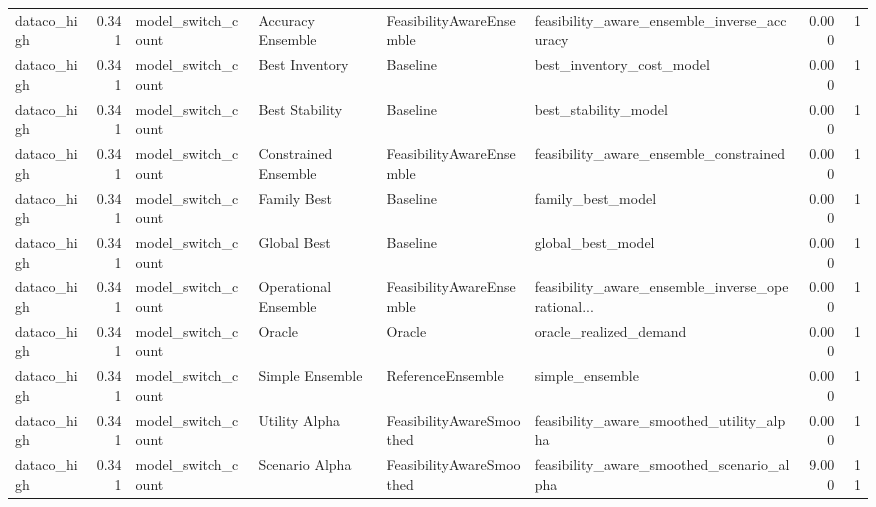 \begin{table}
{\begin{tabular}{lrllllrr}
   dataco\_high &             0.341 &          model\_switch\_count &     Accuracy Ensemble &  FeasibilityAwareEnsemble &        feasibility\_aware\_ensemble\_inverse\_accuracy &         0.000 &               1 \\
   dataco\_high &             0.341 &          model\_switch\_count &        Best Inventory &                  Baseline &                          best\_inventory\_cost\_model &         0.000 &               1 \\
   dataco\_high &             0.341 &          model\_switch\_count &        Best Stability &                  Baseline &                               best\_stability\_model &         0.000 &               1 \\
   dataco\_high &             0.341 &          model\_switch\_count &  Constrained Ensemble &  FeasibilityAwareEnsemble &             feasibility\_aware\_ensemble\_constrained &         0.000 &               1 \\
   dataco\_high &             0.341 &          model\_switch\_count &           Family Best &                  Baseline &                                  family\_best\_model &         0.000 &               1 \\
   dataco\_high &             0.341 &          model\_switch\_count &           Global Best &                  Baseline &                                  global\_best\_model &         0.000 &               1 \\
   dataco\_high &             0.341 &          model\_switch\_count &  Operational Ensemble &  FeasibilityAwareEnsemble &  feasibility\_aware\_ensemble\_inverse\_operational... &         0.000 &               1 \\
   dataco\_high &             0.341 &          model\_switch\_count &                Oracle &                    Oracle &                             oracle\_realized\_demand &         0.000 &               1 \\
   dataco\_high &             0.341 &          model\_switch\_count &       Simple Ensemble &         ReferenceEnsemble &                                    simple\_ensemble &         0.000 &               1 \\
   dataco\_high &             0.341 &          model\_switch\_count &         Utility Alpha &  FeasibilityAwareSmoothed &           feasibility\_aware\_smoothed\_utility\_alpha &         0.000 &               1 \\
   dataco\_high &             0.341 &          model\_switch\_count &        Scenario Alpha &  FeasibilityAwareSmoothed &          feasibility\_aware\_smoothed\_scenario\_alpha &         9.000 &              11 \\

\end{tabular}}
\end{table}
